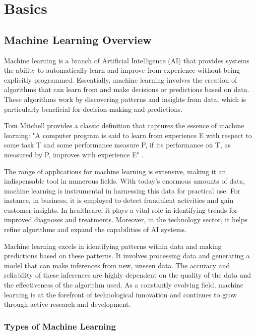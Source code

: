 \chapter{Basics}
\label{sec:basics}

\section{Machine Learning Overview}

Machine learning is a branch of Artificial Intelligence (AI) that provides systems the ability to automatically learn and improve from experience without being explicitly programmed. Essentially, machine learning involves the creation of algorithms that can learn from and make decisions or predictions based on data. These algorithms work by discovering patterns and insights from data, which is particularly beneficial for decision-making and predictions.

Tom Mitchell provides a classic definition that captures the essence of machine learning: "A computer program is said to learn from experience E with respect to some task T and some performance measure P, if its performance on T, as measured by P, improves with experience E" \cite[2]{mitchell1997machine}.

The range of applications for machine learning is extensive, making it an indispensable tool in numerous fields. With today's enormous amounts of data, machine learning is instrumental in harnessing this data for practical use. For instance, in business, it is employed to detect fraudulent activities and gain customer insights. In healthcare, it plays a vital role in identifying trends for improved diagnoses and treatments. Moreover, in the technology sector, it helps refine algorithms and expand the capabilities of AI systems.

Machine learning excels in identifying patterns within data and making predictions based on these patterns. It involves processing data and generating a model that can make inferences from new, unseen data. The accuracy and reliability of these inferences are highly dependent on the quality of the data and the effectiveness of the algorithm used. As a constantly evolving field, machine learning is at the forefront of technological innovation and continues to grow through active research and development.


\subsection{Types of Machine Learning}

